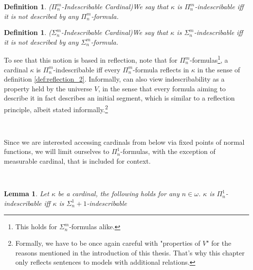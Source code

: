 \documentclass[12pt,a4paper]{article}
\newtheorem{definition}[theorem]{Definition}
\newtheorem{lemma}[theorem]{Lemma}
\begin{document}
\begin{definition}{($\Pi^m_n$-Indescribable Cardinal)}\label{def:pi_mn_indescribable}
We say that $\kappa$ is $\Pi^m_n$-indescribable iff it is not described by any $\Pi^m_n$-formula.
\end{definition}
\begin{definition}{($\Sigma^m_n$-Indescribable Cardinal)}\label{def:sigma_mn_indescribable}
We say that $\kappa$ is $\Sigma^m_n$-indescribable iff it is not described by any $\Sigma^m_n$-formula.
\end{definition}

To see that this notion is based in reflection, note that for $\Pi^m_n$-formulas\footnote{This holds for $\Sigma^m_n$-formulas alike.}, a cardinal $\kappa$ is $\Pi^m_n$-indescribable iff every $\Pi^m_n$-formula reflects in $\kappa$ in the sense of definition \ref{def:reflection_2}. Informally, can also view indescribability as a property held by the universe $V$, in the sense that every formula aiming to describe it in fact describes an initial segment, which is similar to a reflection principle, albeit stated informally.\footnote{Formally, we have to be once again careful with "properties of $V$" for the reasons mentioned in the introduction of this thesis. That's why this chapter only reflects sentences to models with additional relations.}

\

Since we are interested accessing cardinals from below via fixed points of normal functions, we will limit ourselves to $\Pi^1_n$-formulas, with the exception of measurable cardinal, that is included for context.

\

\begin{lemma}
Let $\kappa$ be a cardinal, the following holds for any $n \in \omega$. $\kappa$ is $\Pi^1_n$-indescribable iff $\kappa$ is $\Sigma^1_n+1$-indescribable
\end{lemma}
\end{document}
